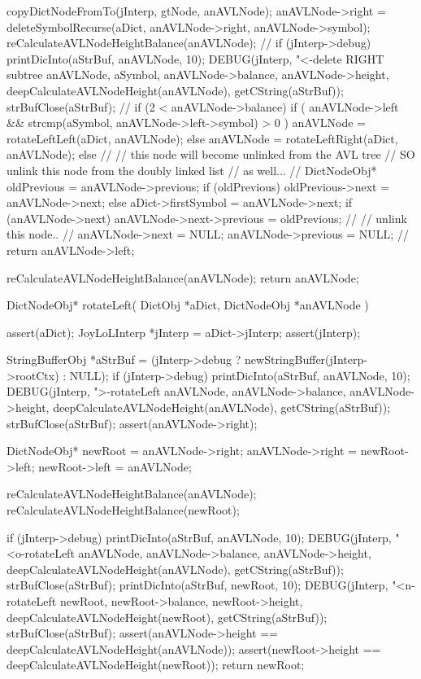 {{{{      }
      copyDictNodeFromTo(jInterp, gtNode, anAVLNode);
      anAVLNode->right =
        deleteSymbolRecurse(aDict, anAVLNode->right, anAVLNode->symbol);
      reCalculateAVLNodeHeightBalance(anAVLNode);
      //
      if (jInterp->debug) {
        printDicInto(aStrBuf, anAVLNode, 10);
        DEBUG(jInterp, "<-delete RIGHT subtree %
            anAVLNode, aSymbol, anAVLNode->balance,
            anAVLNode->height, deepCalculateAVLNodeHeight(anAVLNode),
            getCString(aStrBuf));
        strBufClose(aStrBuf);
      }
      //
      if (2 < anAVLNode->balance) {
        if (
          anAVLNode->left &&
          strcmp(aSymbol, anAVLNode->left->symbol) > 0
          ) {
          anAVLNode = rotateLeftLeft(aDict, anAVLNode);
        } else {
          anAVLNode = rotateLeftRight(aDict, anAVLNode);
        }
      }
    } else {
      //
      // this node will become unlinked from the AVL tree
      // SO unlink this node from the doubly linked list
      // as well...
      //
      DictNodeObj* oldPrevious           = anAVLNode->previous;
      if (oldPrevious) oldPrevious->next = anAVLNode->next;
      else aDict->firstSymbol            = anAVLNode->next;
      if (anAVLNode->next) {
        anAVLNode->next->previous        = oldPrevious;
      }
      //
      // unlink this node..
      //
      anAVLNode->next     = NULL;
      anAVLNode->previous = NULL;
      //
      return anAVLNode->left;
    }
  }

  reCalculateAVLNodeHeightBalance(anAVLNode);
  return anAVLNode;
}

DictNodeObj* rotateLeft(
  DictObj     *aDict,
  DictNodeObj *anAVLNode
) {
  assert(aDict);
  JoyLoLInterp *jInterp = aDict->jInterp;
  assert(jInterp);
 
  StringBufferObj *aStrBuf =
    (jInterp->debug ? newStringBuffer(jInterp->rootCtx) : NULL);
  if (jInterp->debug) {
    printDicInto(aStrBuf, anAVLNode, 10);
    DEBUG(jInterp, ">-rotateLeft %
          anAVLNode, anAVLNode->balance, anAVLNode->height,
          deepCalculateAVLNodeHeight(anAVLNode),
          getCString(aStrBuf));
    strBufClose(aStrBuf);
  }
  assert(anAVLNode->right);

  DictNodeObj* newRoot = anAVLNode->right;
  anAVLNode->right = newRoot->left;
  newRoot->left    = anAVLNode;

  reCalculateAVLNodeHeightBalance(anAVLNode);
  reCalculateAVLNodeHeightBalance(newRoot);

  if (jInterp->debug) {
    printDicInto(aStrBuf, anAVLNode, 10);
    DEBUG(jInterp, "<o-rotateLeft %
          anAVLNode, anAVLNode->balance, anAVLNode->height,
          deepCalculateAVLNodeHeight(anAVLNode),
          getCString(aStrBuf));
    strBufClose(aStrBuf);
    printDicInto(aStrBuf, newRoot, 10);
    DEBUG(jInterp, "<n-rotateLeft %
          newRoot, newRoot->balance, newRoot->height,
          deepCalculateAVLNodeHeight(newRoot),
          getCString(aStrBuf));
    strBufClose(aStrBuf);
  }
  assert(anAVLNode->height == deepCalculateAVLNodeHeight(anAVLNode));
  assert(newRoot->height == deepCalculateAVLNodeHeight(newRoot));
  return newRoot;
}


